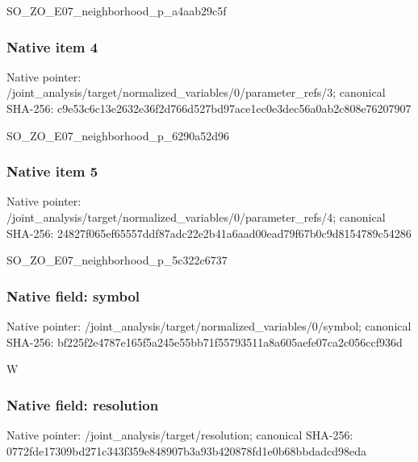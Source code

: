 \documentclass[10pt,a4paper]{article}
\begin{document}
\begingroup\raggedright\sloppy SO\_\allowbreak{}ZO\_\allowbreak{}E07\_\allowbreak{}neighborhood\_\allowbreak{}p\_\allowbreak{}a4aab29c5f\par\endgroup

\subsubsection{Native item 4}
Native pointer: /joint\_\allowbreak{}analysis/target/normalized\_\allowbreak{}variables/0/parameter\_\allowbreak{}refs/3; canonical SHA-256: c9e53c6c13e2632e36f2d766d527bd97ace1ec0e3dec56a0ab2c808e76207907

\begingroup\raggedright\sloppy SO\_\allowbreak{}ZO\_\allowbreak{}E07\_\allowbreak{}neighborhood\_\allowbreak{}p\_\allowbreak{}6290a52d96\par\endgroup

\subsubsection{Native item 5}
Native pointer: /joint\_\allowbreak{}analysis/target/normalized\_\allowbreak{}variables/0/parameter\_\allowbreak{}refs/4; canonical SHA-256: 24827f065ef65557ddf87adc22e2b41a6aad00ead79f67b0c9d8154789c54286

\begingroup\raggedright\sloppy SO\_\allowbreak{}ZO\_\allowbreak{}E07\_\allowbreak{}neighborhood\_\allowbreak{}p\_\allowbreak{}5c322c6737\par\endgroup

\subsubsection{Native field: symbol}
Native pointer: /joint\_\allowbreak{}analysis/target/normalized\_\allowbreak{}variables/0/symbol; canonical SHA-256: bf225f2e4787e165f5a245e55bb71f55793511a8a605aefe07ca2c056ccf936d

\begingroup\raggedright\sloppy W\par\endgroup

\subsubsection{Native field: resolution}
Native pointer: /joint\_\allowbreak{}analysis/target/resolution; canonical SHA-256: 0772fde17309bd271c343f359e848907b3a93b420878fd1e0b68bbdadcd98eda
\end{document}

